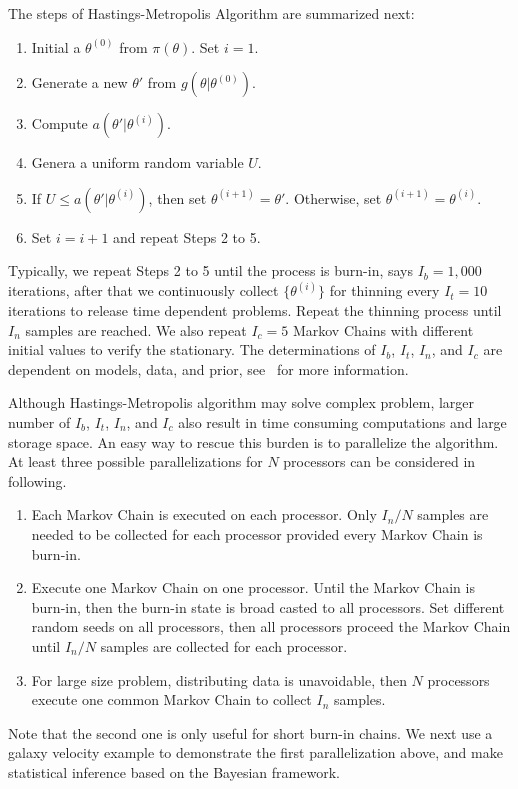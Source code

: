 The steps of Hastings-Metropolis Algorithm are summarized next:
\begin{enumerate}[label=Step \arabic*:]
\item Initial a $\theta^{(0)}$ from $\pi(\theta)$. Set $i = 1$.

\item Generate a new $\theta'$ from $g(\theta | \theta^{(0)})$.

\item Compute $a(\theta' | \theta^{(i)})$.

\item Genera a uniform random variable $U$.

\item If $U \leq a(\theta' | \theta^{(i)})$, then set
      $\theta^{(i + 1)} = \theta'$. Otherwise, set
      $\theta^{(i + 1)} = \theta^{(i)}$.

\item Set $i = i + 1$ and repeat Steps 2 to 5.
\end{enumerate}
Typically, we repeat Steps 2 to 5 until the process is burn-in, says
$I_b = 1,000$ iterations, after that we continuously collect $\{\theta^{(i)}\}$
for thinning every $I_t = 10$ iterations to release time dependent problems.
Repeat the thinning process until $I_n$ samples are reached. We also repeat
$I_c = 5$ Markov Chains with different initial values to verify the stationary.
The determinations of $I_b$, $I_t$, $I_n$,  and $I_c$ are dependent on models,
data, and prior, see~\citet{winbugs} for more information.

Although Hastings-Metropolis algorithm may solve complex problem, larger
number of $I_b$, $I_t$, $I_n$, and $I_c$ also result in time consuming
computations and large storage space. An easy way to rescue this burden is to
parallelize the algorithm. At least three possible parallelizations for $N$
processors can be considered in following.
\begin{enumerate}
\item Each Markov Chain is executed on each processor.
      Only $I_n / N$ samples are needed to be collected for each processor
      provided every Markov Chain is burn-in.
\item Execute one Markov Chain on one processor. Until the Markov Chain
      is burn-in, then the burn-in state is broad casted to all processors.
      Set different random seeds on all processors, then all processors
      proceed the Markov Chain until $I_n / N$ samples are collected for each
      processor.
\item For large size problem, distributing data is unavoidable, then $N$
      processors execute one common Markov Chain to collect $I_n$ samples.
\end{enumerate}
Note that the second one is only useful for short burn-in chains.
We next use a galaxy velocity example to demonstrate the first
parallelization above, and make statistical inference based on the
Bayesian framework.





